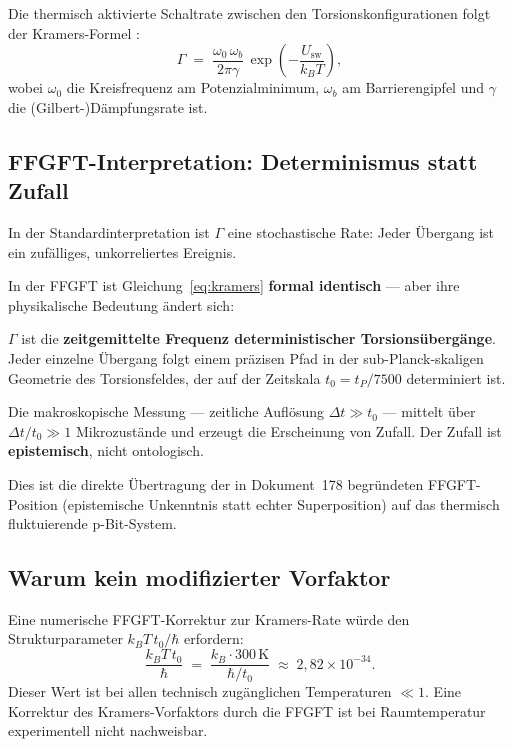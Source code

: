 	Die thermisch aktivierte Schaltrate zwischen den Torsionskonfigurationen
	folgt der Kramers-Formel \cite{Kramers1940, Hanggi1990}:
	\begin{equation}
		\Gamma \;=\; \frac{\omega_0\,\omega_b}{2\pi\gamma}
		\,\exp\!\left(-\frac{U_\text{sw}}{k_B T}\right),
		\label{eq:kramers}
	\end{equation}
	wobei $\omega_0$ die Kreisfrequenz am Potenzialminimum,
	$\omega_b$ am Barrierengipfel und $\gamma$ die (Gilbert-)Dämpfungsrate ist.
	
	\subsection{FFGFT-Interpretation: Determinismus statt Zufall}
	\label{subsec:kramers-ffgft}
	
	In der Standardinterpretation ist $\Gamma$ eine stochastische Rate:
	Jeder Übergang ist ein zufälliges, unkorreliertes Ereignis.
	
	\begin{foundation}
		In der FFGFT ist Gleichung~\eqref{eq:kramers} \textbf{formal identisch}
		--- aber ihre physikalische Bedeutung ändert sich:
		
		$\Gamma$ ist die \textbf{zeitgemittelte Frequenz deterministischer
			Torsionsübergänge}. Jeder einzelne Übergang folgt einem präzisen
		Pfad in der sub-Planck-skaligen Geometrie des Torsionsfeldes,
		der auf der Zeitskala $t_0 = t_P/7500$ determiniert ist.
		
		Die makroskopische Messung --- zeitliche Auflösung $\Delta t \gg t_0$ ---
		mittelt über $\Delta t/t_0 \gg 1$ Mikrozustände und erzeugt
		die Erscheinung von Zufall. Der Zufall ist \textbf{epistemisch},
		nicht ontologisch.
		
		Dies ist die direkte Übertragung der in Dokument~178 begründeten
		FFGFT-Position (epistemische Unkenntnis statt echter Superposition)
		auf das thermisch fluktuierende p-Bit-System.
	\end{foundation}
	
	\subsection{Warum kein modifizierter Vorfaktor}
	\label{subsec:kein-vorfaktor}
	
	Eine numerische FFGFT-Korrektur zur Kramers-Rate würde den
	Strukturparameter $k_BT\,t_0/\hbar$ erfordern:
	\begin{equation}
		\frac{k_B T\,t_0}{\hbar}
		\;=\; \frac{k_B \cdot 300\,\text{K}}{\hbar/t_0}
		\;\approx\; 2{,}82 \times 10^{-34}.
		\label{eq:strukturparameter}
	\end{equation}
	Dieser Wert ist bei allen technisch zugänglichen Temperaturen
	$\ll 1$. Eine Korrektur des Kramers-Vorfaktors durch die FFGFT
	ist bei Raumtemperatur experimentell nicht nachweisbar.
	
